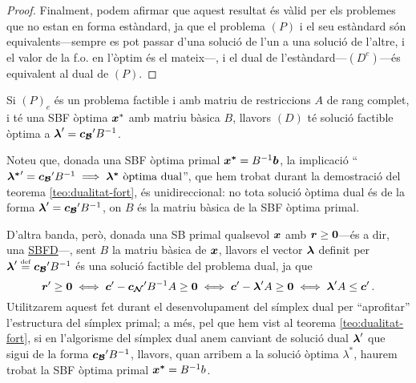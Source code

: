 \begin{teo}
\begin{proof}
		Finalment, podem afirmar que aquest resultat és vàlid per els problemes 
		que
		no estan en forma estàndard, ja que el problema $(P)$ i el seu 
		estàndard són
		equivalents---sempre es pot passar d'una solució de l'un a una solució 
		de
		l'altre, i el valor de la f.o. en l'òptim és el mateix---, i el dual de
		l'estàndard---$(D^e)$---és equivalent al dual de $(P)$.
	\end{proof}
\end{teo}

\begin{col}
	Si $\left(P\right)_e$ és un problema factible i amb matriu de restriccions
	$A$ de rang complet, i té una SBF òptima $\boldsymbol{x}^\ast$ amb matriu bàsica 
	$B$,
	llavors $\left(D\right)$ té solució factible òptima a $\boldsymbol{\lambda}' =
	\boldsymbol{c_{\mathcal{B}}}'B^{-1}$.
\end{col}

Noteu que, donada una SBF òptima primal $\boldsymbol{x^\ast} = B^{-1}\boldsymbol{b}$, la
implicació ``$\boldsymbol{\lambda^\ast}'= \boldsymbol{c_{\mathcal{B}}}'B^{-1} \implies \boldsymbol{\lambda^\ast}
\text{ òptima dual}$'', que hem trobat durant la demostració del teorema
\ref{teo:dualitat-fort}, és unidireccional: no tota solució òptima dual és de la
forma $\boldsymbol{\lambda}' = \boldsymbol{c_{\mathcal{B}}}'B^{-1}$, on $B$ és la matriu bàsica de la SBF
òptima primal. 

D'altra banda, però, donada una SB primal qualsevol $\boldsymbol{x}$ amb $\boldsymbol{r} \ge
\boldsymbol{0}$---és a dir, una \hyperref[defi:SBFD]{SBFD}---, sent $B$ la matriu bàsica
de $\boldsymbol{x}$, llavors el vector $\boldsymbol{\lambda}$ definit per $\boldsymbol{\lambda}' \stackrel{\text{\tiny def}}{=}
\boldsymbol{c_{\mathcal{B}}}'B^{-1}$ és una solució factible del problema dual, ja que
\[
\boldsymbol{r}'\ge \boldsymbol{0} \iff \boldsymbol{c}' - \boldsymbol{c_{\mathcal{N}}}'B^{-1}A \ge \boldsymbol{0} \iff \boldsymbol{c}' -
\boldsymbol{\lambda}'A \ge \boldsymbol{0}  \iff \boldsymbol{\lambda}'A \le \boldsymbol{c}'\,.
\]
Utilitzarem aquest fet durant el desenvolupament del símplex dual per
``aprofitar'' l'estructura del símplex primal; a més, pel que hem vist al
teorema \ref{teo:dualitat-fort}, si en l'algorisme del símplex dual anem
canviant de solució dual $\boldsymbol{\lambda}'$ que sigui de la forma $\boldsymbol{c_{\mathcal{B}}}'
B^{-1}$, llavors, quan arribem a la solució òptima $\lambda^\ast$, haurem trobat
la SBF òptima primal $\boldsymbol{x^\ast} = B^{-1}b$.

